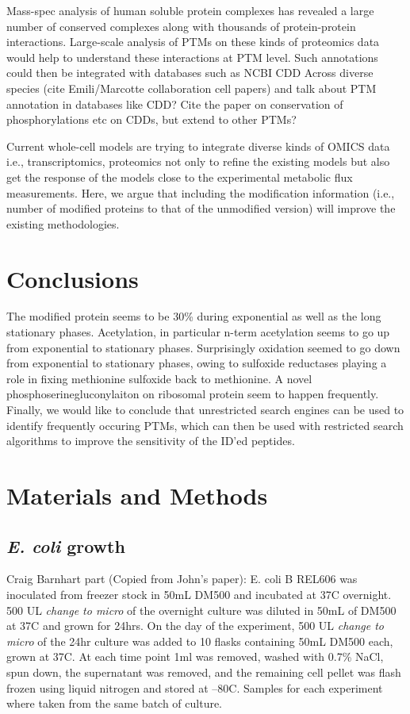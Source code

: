 \documentclass[12pt]{article}
\begin{document}
Mass-spec analysis of human soluble protein complexes has revealed a large number of conserved complexes along with thousands of protein-protein interactions. Large-scale analysis of PTMs on these kinds of proteomics data would help to understand these interactions at PTM level. Such annotations could then be integrated with databases such as NCBI CDD
Across diverse species (cite Emili/Marcotte collaboration cell papers) and talk about PTM annotation in databases like CDD? Cite the paper on conservation of phosphorylations etc on CDDs, but extend to other PTMs?

Current whole-cell models \cite{Covertetal2008} are trying to integrate diverse kinds of OMICS data i.e., transcriptomics, proteomics not only to refine the existing models but also get the response of the models close to the experimental metabolic flux measurements. Here, we argue that including the modification information (i.e., number of modified proteins to that of the unmodified version) will improve the existing methodologies.



\section{Conclusions}

The modified protein seems to be 30\% during exponential as well as the long stationary phases. Acetylation, in particular n-term acetylation seems to go up from exponential to stationary phases. Surprisingly oxidation seemed to go down from exponential to stationary phases, owing to sulfoxide reductases playing a role in fixing methionine sulfoxide back to methionine. A novel phosphoserinegluconylaiton on ribosomal protein seem to happen frequently. Finally, we would like to conclude that unrestricted search engines can be used to identify frequently occuring PTMs, which can then be used with restricted search algorithms to improve the sensitivity of the ID'ed peptides.


\section{Materials and Methods}

\subsection{\emph{E. coli} growth} 
Craig Barnhart part (Copied from John’s paper):
E. coli B REL606 was inoculated from freezer stock in 50mL DM500 and incubated at 37C overnight. 500 UL \emph{change to micro} of the overnight culture was diluted in 50mL of DM500 at 37C and grown for 24hrs. On the day of the experiment, 500 UL \emph{change to micro} of the 24hr culture was added to 10 flasks containing 50mL DM500 each, grown at 37C. At each time point 1ml was removed, washed with 0.7\% NaCl, spun down, the supernatant was removed, and the remaining cell pellet was flash frozen using liquid nitrogen and stored at –80C. Samples for each experiment where taken from the same batch of culture. 
\end{document}
